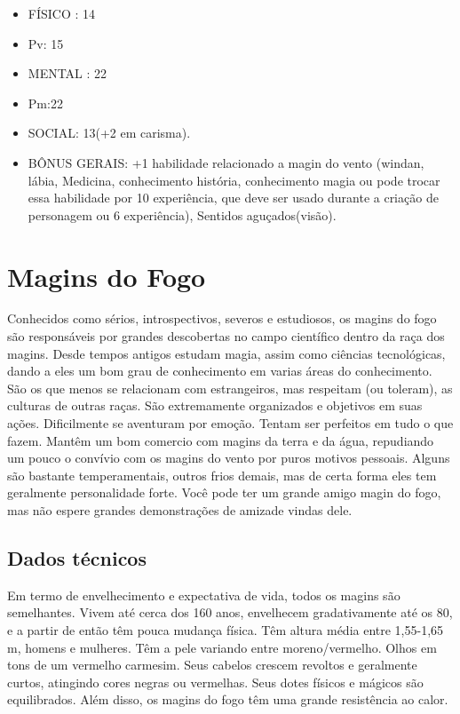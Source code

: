 \begin{itemize}
\item FÍSICO : 14
\item Pv: 15 

\item MENTAL : 22
\item Pm:22

\item SOCIAL: 13(+2 em carisma).

\item BÔNUS GERAIS: +1 habilidade relacionado a magin do vento (windan, lábia, Medicina, conhecimento história, conhecimento magia ou pode trocar essa habilidade por 10 experiência, que deve ser usado durante a criação de personagem ou 6 experiência), Sentidos aguçados(visão).

\end{itemize}



\section{Magins do Fogo}

Conhecidos como sérios, introspectivos, severos e estudiosos, os magins do fogo são responsáveis por grandes descobertas no campo científico dentro da raça dos magins. Desde tempos antigos estudam magia, assim como ciências tecnológicas, dando a eles um bom grau de conhecimento em varias áreas do conhecimento. São os que menos se relacionam com estrangeiros, mas respeitam (ou toleram), as culturas de outras raças. São extremamente organizados e objetivos em suas ações. Dificilmente se aventuram por emoção. Tentam ser perfeitos em tudo o que fazem. Mantêm um bom comercio com magins da terra e da água, repudiando um pouco o convívio com os magins do vento por puros motivos pessoais. Alguns são bastante temperamentais, outros frios demais, mas de certa forma eles tem geralmente personalidade forte. Você pode ter um grande amigo magin do fogo, mas não espere grandes demonstrações de amizade vindas dele.

\subsection{Dados técnicos}


Em termo de envelhecimento e expectativa de vida, todos os magins são semelhantes. Vivem até cerca dos 160 anos, envelhecem gradativamente até os 80, e a partir de então têm pouca mudança física. Têm altura média entre 1,55-1,65 m, homens e mulheres. Têm a pele variando entre moreno/vermelho. Olhos em tons de um vermelho carmesim. Seus cabelos crescem revoltos e geralmente curtos, atingindo cores negras ou vermelhas. Seus dotes físicos e mágicos são equilibrados. Além disso, os magins do fogo têm uma grande resistência ao calor.



